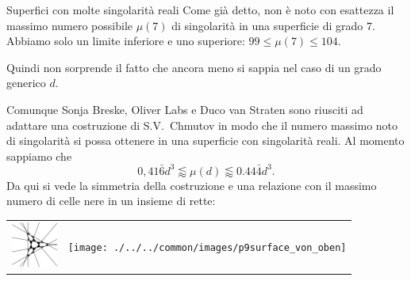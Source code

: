 \begin{surferPage}[216 Singularities]{Superfici con molte singolarit\`a reali}
    Come gi\`a detto, non \`e noto con esattezza il massimo numero possibile 
    $\mu(7)$ di singolarit\`a in una superficie di grado $7$.
    Abbiamo solo un limite inferiore e uno superiore: $99\le \mu(7) \le 104$. 

    Quindi non sorprende il fatto che ancora meno si sappia nel caso di un grado generico $d$. 

    Comunque Sonja Breske, Oliver Labs e Duco van Straten sono riusciti ad adattare una costruzione di S.V.\ Chmutov in modo che il numero massimo noto di singolarit\`a si possa ottenere in una superficie con singolarit\`a reali.
    Al momento sappiamo che
    \[0,41\bar{6}d^3 \lessapprox \mu(d) \lessapprox 0.44\bar{4} d^3.\]
     Da qui si vede la simmetria della costruzione e una relazione con il massimo numero di celle nere in un insieme di rette:
    \begin{center}
      \begin{tabular}{c@{\qquad}c}
        \includegraphics[height=1.5cm]{./../../common/images/vielesing.pdf}
        &
        \texttt{[image: ./../../common/images/p9surface\_von\_oben]}
      \end{tabular}
    \end{center}
\end{surferPage}
